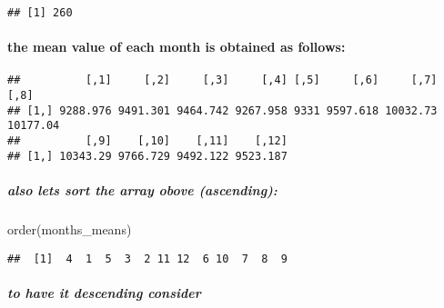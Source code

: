 \documentclass[
]{article}
\newenvironment{Shaded}{\begin{snugshade}}{\end{snugshade}}
\newcommand{\ControlFlowTok}[1]{\textcolor[rgb]{0.13,0.29,0.53}{\textbf{#1}}}
\newcommand{\DecValTok}[1]{\textcolor[rgb]{0.00,0.00,0.81}{#1}}
\newcommand{\FunctionTok}[1]{\textcolor[rgb]{0.00,0.00,0.00}{#1}}
\newcommand{\NormalTok}[1]{#1}
\newcommand{\OtherTok}[1]{\textcolor[rgb]{0.56,0.35,0.01}{#1}}
\newcommand{\SpecialCharTok}[1]{\textcolor[rgb]{0.00,0.00,0.00}{#1}}
\begin{document}
\begin{verbatim}
## [1] 260
\end{verbatim}

\hypertarget{the-mean-value-of-each-month-is-obtained-as-follows}{%
\paragraph{the mean value of each month is obtained as
follows:}\label{the-mean-value-of-each-month-is-obtained-as-follows}}

\begin{Shaded}
\end{Shaded}

\begin{verbatim}
##          [,1]     [,2]     [,3]     [,4] [,5]     [,6]     [,7]     [,8]
## [1,] 9288.976 9491.301 9464.742 9267.958 9331 9597.618 10032.73 10177.04
##          [,9]    [,10]    [,11]    [,12]
## [1,] 10343.29 9766.729 9492.122 9523.187
\end{verbatim}

\hypertarget{also-lets-sort-the-array-obove-ascending}{%
\subparagraph{also lets sort the array obove
(ascending):}\label{also-lets-sort-the-array-obove-ascending}}

\begin{Shaded}
\begin{Highlighting}[]
\FunctionTok{order}\NormalTok{(months\_means)}
\end{Highlighting}
\end{Shaded}

\begin{verbatim}
##  [1]  4  1  5  3  2 11 12  6 10  7  8  9
\end{verbatim}

\hypertarget{to-have-it-descending-consider}{%
\subparagraph{to have it descending
consider}\label{to-have-it-descending-consider}}
\end{document}
